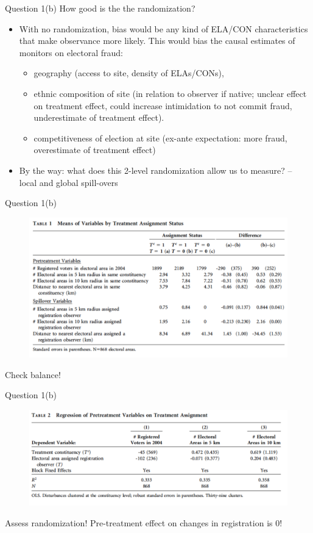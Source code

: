 \documentclass[xcolor=table,dvipsnames]{beamer}
\begin{document}
\begin{frame}{Question 1(b)}
How good is the the randomization?
\begin{itemize}
\item With no randomization, bias would be any kind of ELA/CON characteristics that make observance more likely. This would bias the causal estimates of monitors on electoral fraud: \pause
\begin{itemize}
\item geography (access to site, density of ELAs/CONs), 
\item ethnic composition of site (in relation to observer if native; unclear effect on treatment effect, could increase intimidation to not commit fraud, underestimate of treatment effect).
\item competitiveness of election at site (ex-ante expectation: more fraud, overestimate of treatment effect) \pause
\end{itemize}
\item By the way: what does this 2-level randomization allow us to measure? \pause -- local and global spill-overs
\end{itemize}

\end{frame}
\begin{frame}{Question 1(b)}
\begin{figure}[H]\centering
\includegraphics[scale=.37]{pictures/ichinoSchuendeln_balance.pdf}
\end{figure} \pause

Check balance!
\end{frame}

\begin{frame}{Question 1(b)}
\begin{figure}[H]
\includegraphics[scale=.37]{pictures/ichinoSchuendeln_preTreatmentOnTreatment.pdf}
\end{figure}\pause

Assess randomization! Pre-treatment effect on changes in registration is 0!
\end{frame}
\end{document}
